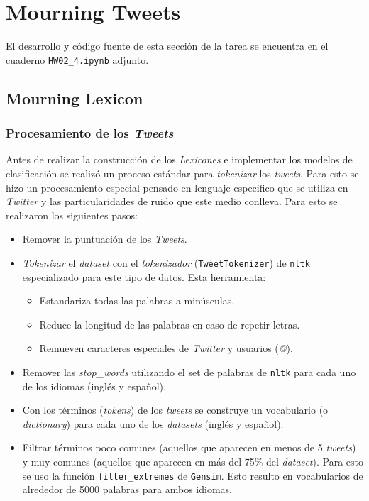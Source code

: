 \newpage

\section{Mourning Tweets}

El desarrollo y código fuente de esta sección de la tarea se encuentra en el cuaderno \texttt{HW02\_4.ipynb} adjunto.

\subsection{Mourning Lexicon}

\subsubsection{Procesamiento de los \textit{Tweets}}

Antes de realizar la construcción de los \textit{Lexicones} e implementar los modelos de clasificación se realizó un proceso estándar para \textit{tokenizar} los \textit{tweets}. Para esto se hizo un procesamiento especial pensado en lenguaje especifico que se utiliza en \textit{Twitter} y las particularidades de ruido que este medio conlleva. Para esto se realizaron los siguientes pasos:

\begin{itemize}
    \item Remover la puntuación de los \textit{Tweets}.
    
    \item \textit{Tokenizar} el \textit{dataset} con el \textit{tokenizador} (\texttt{TweetTokenizer}) de \texttt{nltk} especializado para este tipo de datos. Esta herramienta:
    \begin{itemize}
        \item Estandariza todas las palabras a minúsculas.
        
        \item Reduce la longitud de las palabras en caso de repetir letras.
        
        \item Remueven caracteres especiales de \textit{Twitter} y usuarios (\textit{@}).
    \end{itemize}
    
    \item Remover las \textit{stop\_words} utilizando el set de palabras de \texttt{nltk} para cada uno de los idiomas (inglés y español).
    
    \item Con los términos (\textit{tokens}) de los \textit{tweets} se construye un vocabulario (o \textit{dictionary}) para cada uno de los \textit{datasets} (inglés y español). 
    
    \item Filtrar términos poco comunes (aquellos que aparecen en menos de 5 \textit{tweets}) y muy comunes (aquellos que aparecen en más del 75\% del \textit{dataset}). Para esto se uso la función \texttt{filter\_extremes} de \texttt{Gensim}. Esto resulto en vocabularios de alrededor de 5000 palabras para ambos idiomas.
    
\end{itemize}

